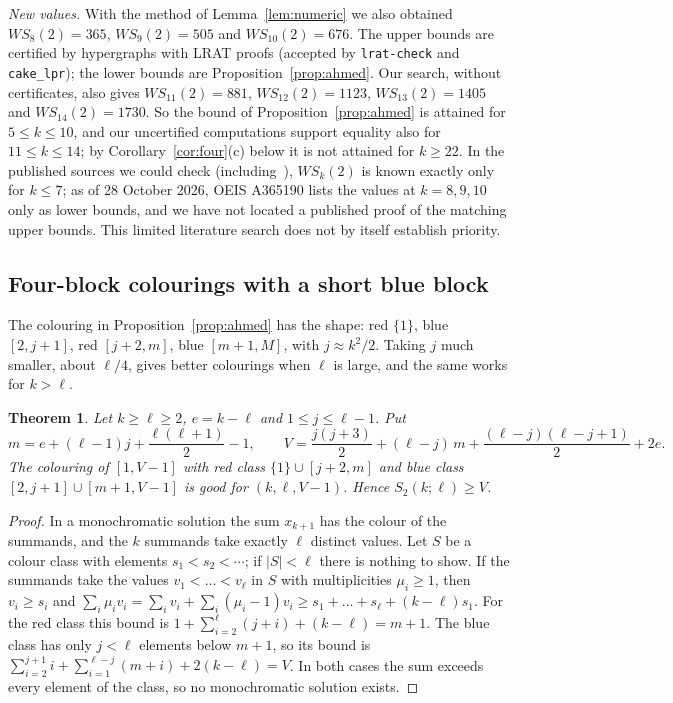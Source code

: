 \documentclass[11pt]{amsart}
\newtheorem{theorem}{Theorem}
\theoremstyle{definition}
\newcommand{\Stwo}{S_2}
\begin{document}
\noindent\emph{New values.} With the method of Lemma~\ref{lem:numeric} we also obtained $WS_8(2)=365$, $WS_9(2)=505$ and $WS_{10}(2)=676$. The upper bounds are certified by hypergraphs with LRAT proofs (accepted by \texttt{lrat-check} and \texttt{cake\_lpr}); the lower bounds are Proposition~\ref{prop:ahmed}. Our search, without certificates, also gives $WS_{11}(2)=881$, $WS_{12}(2)=1123$, $WS_{13}(2)=1405$ and $WS_{14}(2)=1730$. So the bound of Proposition~\ref{prop:ahmed} is attained for $5\le k\le 10$, and our uncertified computations support equality also for $11\le k\le14$; by Corollary~\ref{cor:four}(c) below it is not attained for $k\ge22$. In the published sources we could check (including~\cite{ABRS2}), $WS_k(2)$ is known exactly only for $k\le7$; as of 28 October 2026, OEIS A365190 lists the values at $k=8,9,10$ only as lower bounds, and we have not located a published proof of the matching upper bounds. This limited literature search does not by itself establish priority.

\subsection*{Four-block colourings with a short blue block} The colouring in Proposition~\ref{prop:ahmed} has the shape: red $\{1\}$, blue $[2,j+1]$, red $[j+2,m]$, blue $[m+1,M]$, with $j\approx k^2/2$. Taking $j$ much smaller, about $\ell/4$, gives better colourings when $\ell$ is large, and the same works for $k>\ell$.

\begin{theorem}\label{thm:four}
Let $k\ge\ell\ge2$, $e=k-\ell$ and $1\le j\le\ell-1$. Put
\[
m=e+(\ell-1)j+\frac{\ell(\ell+1)}{2}-1,\qquad V=\frac{j(j+3)}{2}+(\ell-j)\,m+\frac{(\ell-j)(\ell-j+1)}{2}+2e .
\]
The colouring of $[1,V-1]$ with red class $\{1\}\cup[j+2,m]$ and blue class $[2,j+1]\cup[m+1,V-1]$ is good for $(k,\ell,V-1)$. Hence $\Stwo(k;\ell)\ge V$.
\end{theorem}

\begin{proof}
In a monochromatic solution the sum $x_{k+1}$ has the colour of the summands, and the $k$ summands take exactly $\ell$ distinct values. Let $S$ be a colour class with elements $s_1<s_2<\cdots$; if $|S|<\ell$ there is nothing to show. If the summands take the values $v_1<\dots<v_\ell$ in $S$ with multiplicities $\mu_i\ge1$, then $v_i\ge s_i$ and $\sum_i\mu_iv_i=\sum_iv_i+\sum_i(\mu_i-1)v_i\ge s_1+\dots+s_\ell+(k-\ell)s_1$. For the red class this bound is $1+\sum_{i=2}^{\ell}(j+i)+(k-\ell)=m+1$. The blue class has only $j<\ell$ elements below $m+1$, so its bound is $\sum_{i=2}^{j+1}i+\sum_{i=1}^{\ell-j}(m+i)+2(k-\ell)=V$. In both cases the sum exceeds every element of the class, so no monochromatic solution exists.
\end{proof}
\end{document}
